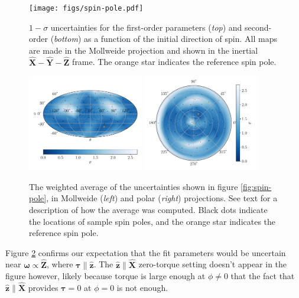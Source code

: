 \documentclass[fleqn,usenatbib]{mnras}
\newcommand{\unit}[1]{\bm{\hat{#1}}}
\begin{document}
\begin{figure}
  \centering
  \texttt{[image: figs/spin-pole.pdf]}
  \caption{$1-\sigma$ uncertainties for the first-order parameters (\textit{top}) and second-order (\textit{bottom}) as a function of the initial direction of spin. All maps are made in the Mollweide projection and shown in the inertial $\unit X-\unit Y-\unit Z$ frame. The orange star indicates the reference spin pole.}
  \label{fig:scan-spin}
\end{figure}

\begin{figure}
  \centering
  \includegraphics[width=0.45\textwidth]{figs/spin-pole-avg-mollweide.pdf}
  \includegraphics[width=0.45\textwidth]{figs/spin-pole-avg-polar.pdf}
  \caption{The weighted average of the uncertainties shown in figure \ref{fig:spin-pole}, in Mollweide (\textit{left}) and polar (\textit{right}) projections. See text for a description of how the average was computed. Black dots indicate the locations of sample spin poles, and the orange star indicates the reference spin pole.}
  \label{fig:scan-spin-avg}
\end{figure}

Figure \ref{fig:scan-spin-avg} confirms our expectation that the fit parameters would be uncertain near $\bm \omega \propto \unit Z$, where $\bm \tau \parallel \unit z$. The $\unit z \parallel \unit X$ zero-torque setting doesn't appear in the figure however, likely because torque is large enough at $\phi \neq 0$ that the fact that $\unit z \parallel \unit X$ provides $\bm \tau = 0$ at $\phi = 0$ is not enough.
\end{document}

